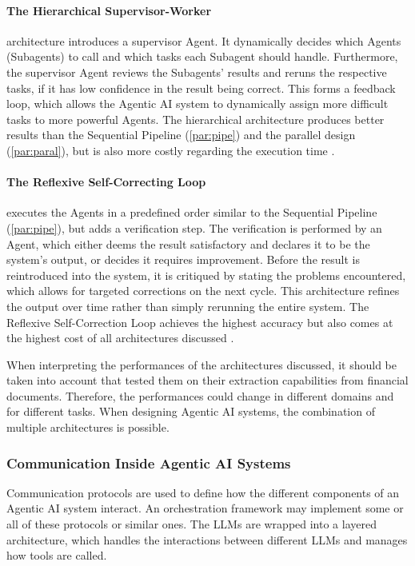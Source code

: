 \documentclass[
	fontsize = 11pt,
	paper = a4,
	draft = false,
	twoside = true,
	titlepage = false
]{scrartcl}
\numberwithin{equation}{subsection}
\begin{document}
	\paragraph{The Hierarchical Supervisor-Worker} \autocite[p.~4-5]{orchStyles} \label{par:hierSup} architecture introduces a supervisor \gls{Agent}. It dynamically decides which \glspl{Agent} (Subagents) to call and which tasks each Subagent should handle. Furthermore, the supervisor \gls{Agent} reviews the Subagents' results and reruns the respective tasks, if it has low confidence in the result being correct. This forms a feedback loop, which allows the \gls{Agentic AI} system to dynamically assign more difficult tasks to more powerful \glspl{Agent}. The hierarchical architecture produces better results than the Sequential Pipeline (\autoref{par:pipe}) and the parallel design (\autoref{par:paral}), but is also more costly regarding the execution time \autocite[p.~7]{orchStyles}. \autocite{orchStyles}
	
	\paragraph{The Reflexive Self-Correcting Loop} \label{par:RefLoop} \autocite[p.~5]{orchStyles} \label{par:reflex} executes the \glspl{Agent} in a predefined order similar to the Sequential Pipeline (\autoref{par:pipe}), but adds a verification step. The verification is performed by an \gls{Agent}, which either deems the result satisfactory and declares it to be the system's output, or decides it requires improvement. Before the result is reintroduced into the system, it is critiqued by stating the problems encountered, which allows for targeted corrections on the next cycle. This architecture refines the output over time rather than simply rerunning the entire system. The Reflexive Self-Correction Loop \autocite[p.~5]{orchStyles} achieves the highest accuracy but also comes at the highest cost of all architectures discussed \autocite[p.~7]{orchStyles}. \autocite{orchStyles}
	
	When interpreting the performances of the architectures discussed, it should be taken into account that \citeauthor{orchStyles} \autocite[p.~14-15]{orchStyles} tested them on their extraction capabilities from financial documents.
	Therefore, the performances could change in different domains and for different tasks. When designing \gls{Agentic AI} systems, the combination of multiple architectures is possible.
	
	\subsubsection{Communication Inside \gls{Agentic AI} Systems} \label{subsub:protocols}
	Communication protocols are used to define how the different components of an \gls{Agentic AI} system interact. An orchestration framework may implement some or all of these protocols or similar ones. The \gls{LLM}s are wrapped into a layered architecture, which handles the interactions between different \gls{LLM}s and manages how tools are called. \autocite{howToolsAreUsed}
	
\end{document}
